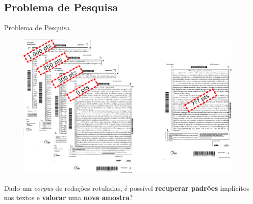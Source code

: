 \subsection{Problema de Pesquisa}
  \begin{frame}[fragile]{Problema de Pesquisa}
    \begin{figure}[H]
    \begin{center}
        \includegraphics[scale=0.50]{images/problema_pesquisa.png}
    \end{center}
    \end{figure}

    Dado um \textit{corpus} de redações rotuladas, é possível \textbf{recuperar padrões}
    implícitos nos textos e \textbf{valorar} uma \textbf{nova amostra}?
  \end{frame}